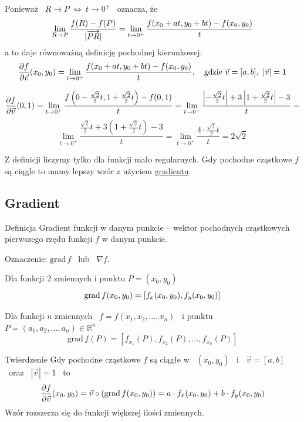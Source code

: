 Ponieważ \ $ R \to P \ \Leftrightarrow \ t \to 0^+ $ \ oznacza, że
\[ \lim_{R \to P} \frac{f(R) - f(P)}{|\overrightarrow{PR}|} = \lim_{t \to 0^+} \frac{f(x_0 + at, y_0 + bt) - f(x_0, y_0)}{t} \]
a to daje równoważną definicję pochodnej kierunkowej:
\[ \frac{\partial f}{\partial \vec{v}} (x_0, y_0) = \lim_{t \to 0^+} \frac{f(x_0 + at, y_0 + bt) - f(x_0, y_0)}{t}, \quad \text{gdzie} \ \vec{v} = [a,b], \ |\vec{v}| = 1 \]

\begin{przyklad}
    \[ \frac{\partial f}{\partial \vec{v}} (0,1) = \lim_{t \to 0^+} \frac{f \left( 0 - \frac{\sqrt{2}}{2}t, 1 + \frac{\sqrt{2}}{2}t \right) - f(0,1)}{t}
    = \lim_{t \to 0^+} \frac{ \left| -\frac{\sqrt{2}}{2}t \right| + 3 \left| 1 + \frac{\sqrt{2}}{2}t \right| - 3 }{t} = \]
    \[ \lim_{t \to 0^+} \frac{ \frac{\sqrt{2}}{2}t + 3 \left( 1 + \frac{\sqrt{2}}{2}t \right) - 3 }{t} = \lim_{t \to 0^+} \frac{4 \cdot \frac{\sqrt{2}}{2}t}{t} = 2 \sqrt{2} \]
\end{przyklad}

Z definicji liczymy tylko dla funkcji mało regularnych. Gdy pochodne cząstkowe $f$ są ciągle to mamy lepszy wzór z użyciem \underline{gradientu}.

\subsection{Gradient}

\begin{tw}{Definicja}
    Gradient funkcji w danym punkcie -- wektor pochodnych cząstkowych pierwszego rzędu funkcji $f$ w danym punkcie.

    Oznaczenie: $ \text{grad}\, f$ \ lub \ $ \nabla f $.

    Dla funkcji 2 zmiennych i punktu $ P = (x_0, y_0) $
    \[ \text{grad}\, f(x_0, y_0) = [f_x(x_0, y_0), f_y(x_0, y_0)] \]

    Dla funkcji $n$ zmiennych \ $ f = f(x_1, x_2, ..., x_n) $ \ i punktu \ $ P = (a_1, a_2, ..., a_n) \in \mathbb{R}^n $
    \[ \text{grad} \, f(P) = [f_{x_1}(P), f_{x_2}(P), ..., f_{x_n}(P)] \]
\end{tw}

\begin{tw}{Twierdzenie}
    Gdy pochodne cząstkowe $f$ są ciągłe w \ $ (x_0, y_0) $ \ i \ $ \vec{v} = [a,b] $ \ oraz \ $ |\vec{v}| = 1 $ \ to
    \[ \frac{\partial f}{\partial \vec{v}} (x_0, y_0) = \vec{v} \circ (\text{grad} \, f(x_0, y_0)) = a \cdot f_x(x_0, y_0) + b \cdot f_y(x_0, y_0) \]
    Wzór rozszerza się do funkcji większej ilości zmiennych.    
\end{tw}

